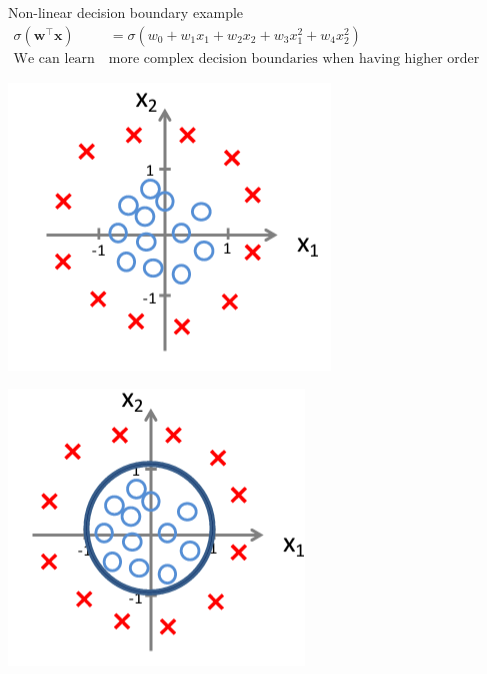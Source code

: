 \documentclass[serif, aspectratio=169]{beamer}
\begin{document}
\begin{frame}{Non-linear decision boundary example}
    \begin{align*}
        \sigma (\mathbf{w}^\top \mathbf{x}) &= \sigma (w_0 + w_1 x_1 + w_2 x_2 + w_3x_1^2 + w_4x_2^2) \\
        \text{We can learn } & \text{more complex decision boundaries when having higher order terms}
    \end{align*}
    
    \begin{minipage}{0.30\linewidth}
        \centering
        \includegraphics[width=\linewidth]{pic/lrDB3.png}
    \end{minipage}
    \hfill
    \begin{minipage}{0.30\linewidth}
        \centering
        \includegraphics[width=\linewidth]{pic/lrDB4.png}
    \end{minipage}
    

\end{frame}
\end{document}
